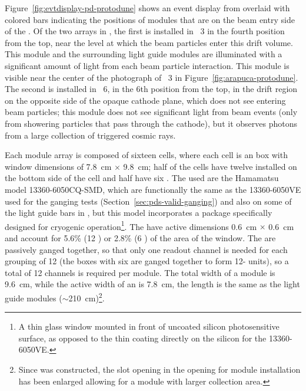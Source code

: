 Figure~\ref{fig:evtdisplay-pd-protodune} shows an event display from  overlaid with colored bars indicating the positions of  modules that are on the beam entry side of the .
Of the two  arrays in , the first is installed in ~3 in the fourth position from the top, near the level at which the beam particles enter this drift volume. This module and the surrounding light guide modules are illuminated with a significant amount of light from each beam particle interaction. This module is visible near the center of the photograph of ~3 in Figure~\ref{fig:arapuca-protodune}.
The second is installed in  ~6, in the 6th position from the top, in the drift region on the opposite side of the opaque cathode plane, which does not see entering beam particles; this module does not see significant light from beam events (only from showering particles that pass through the cathode), but it observes photons from a large collection of triggered cosmic rays.
 
Each   module array is composed of sixteen cells, where each cell is an  box with window dimensions of \SI{7.8}{cm} $\times$ \SI{9.8}{cm}; half of the cells have twelve  installed on the bottom side of the cell and  half have six . 
The  used are the Hamamatsu model 13360-6050CQ-SMD, which are functionally the same as the 13360-6050VE used for the ganging tests (Section~\ref{sec:pds-valid-ganging}) and also on some of the light guide bars in , but this model incorporates a package specifically designed for cryogenic operation\footnote{A thin glass window mounted in front of uncoated silicon photosensitive surface, as opposed to the thin coating directly on the silicon for the 13360-6050VE.}. 
The  have active dimensions \SI{0.6}{cm} $\times$ \SI{0.6}{cm} and account for 5.6\% (\num{12} ) or \num{2.8}\% (\num{6} ) of the area of the window.
The   are passively ganged together, so that only one readout channel is needed for each  grouping of \num{12}  (the boxes with six  are ganged together to form \num{12}- units), so a total of \num{12} channels is required per  module. 
The total width of a module is \SI{9.6}{cm}, while the active width of an  is \SI{7.8}{cm}, the length is the same as the light guide modules ($\sim$\SI{210}{cm})\footnote{Since  was constructed, the slot opening in the  opening for  module installation has been enlarged allowing for a module with larger collection area.}.

